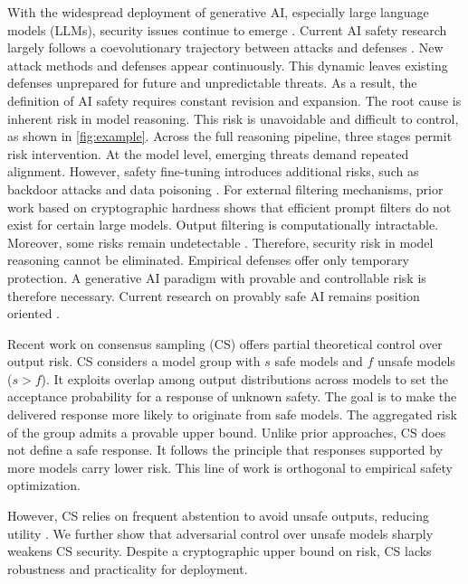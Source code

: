 \documentclass[11pt]{article}
\begin{document}
With the widespread deployment of generative AI, especially large language models (LLMs), security issues continue to emerge \citep{ji2023beaver, Liu2024injection, Zhan2025CAIS, wang2025uniquesec}. Current AI safety research largely follows a coevolutionary trajectory between attacks and defenses \citep{zhang2025jbshield}. New attack methods and defenses appear continuously. This dynamic leaves existing defenses unprepared for future and unpredictable threats. As a result, the definition of AI safety requires constant revision and expansion. The root cause is inherent risk in model reasoning. This risk is unavoidable and difficult to control, as shown in \autoref{fig:example}. Across the full reasoning pipeline, three stages permit risk intervention. At the model level, emerging threats demand repeated alignment. However, safety fine-tuning \citep{jain2024makes} introduces additional risks, such as backdoor attacks \citep{xu-etal-2024-instructions, wen2024privacy} and data poisoning \citep{chen2024agentpoison}. For external filtering mechanisms, prior work \citep{ball2025impossibility} based on cryptographic hardness shows that efficient prompt filters do not exist for certain large models. Output filtering is computationally intractable. Moreover, some risks remain undetectable \citep{kalai2025consensus}. Therefore, security risk in model reasoning cannot be eliminated. Empirical defenses offer only temporary protection. A generative AI paradigm with provable and controllable risk is therefore necessary. Current research on provably safe AI remains position oriented \citep{dalrymple2024towards}.


Recent work on consensus sampling (CS) \citep{kalai2025consensus} offers partial theoretical control over output risk. CS considers a model group with $s$ safe models and $f$ unsafe models ($s > f$). It exploits overlap among output distributions across models to set the acceptance probability for a response of unknown safety. The goal is to make the delivered response more likely to originate from safe models. The aggregated risk of the group admits a provable upper bound. Unlike prior approaches, CS does not define a safe response. It follows the principle that responses supported by more models carry lower risk. This line of work is orthogonal to empirical safety optimization.

However, CS relies on frequent abstention to avoid unsafe outputs, reducing utility \citep{paulus2025safety}. We further show that adversarial control over unsafe models sharply weakens CS security. Despite a cryptographic upper bound on risk, CS lacks robustness and practicality for deployment.
\end{document}
